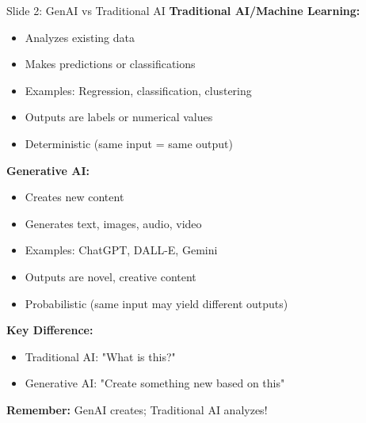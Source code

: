\documentclass[8pt]{beamer}
\begin{document}
	\begin{frame}{Slide 2: GenAI vs Traditional AI}
		\fontsize{6.5}{7.5}\selectfont
		\textbf{Traditional AI/Machine Learning:}
		\begin{itemize}
			\item Analyzes existing data
			\item Makes predictions or classifications
			\item Examples: Regression, classification, clustering
			\item Outputs are labels or numerical values
			\item Deterministic (same input = same output)
		\end{itemize}
		
		\vspace{0.1cm}
		\textbf{Generative AI:}
		\begin{itemize}
			\item Creates new content
			\item Generates text, images, audio, video
			\item Examples: ChatGPT, DALL-E, Gemini
			\item Outputs are novel, creative content
			\item Probabilistic (same input may yield different outputs)
		\end{itemize}
		
		\vspace{0.1cm}
		\textbf{Key Difference:}
		\begin{itemize}
			\item Traditional AI: "What is this?"
			\item Generative AI: "Create something new based on this"
		\end{itemize}
		
		\textcolor{myblue}{\textbf{Remember:}} GenAI creates; Traditional AI analyzes!
	\end{frame}
	
\end{document}
